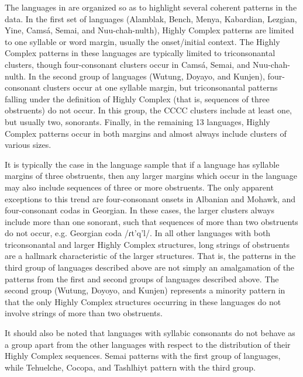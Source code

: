   The languages in  are organized so as to highlight several coherent patterns in the data. In the first set of languages (Alamblak, Bench, Menya, Kabardian, Lezgian, Yine, Camsá, Semai, and Nuu-chah-nulth), Highly Complex patterns are limited to one syllable or word margin, usually the onset/initial context. The Highly Complex patterns in these languages are typically limited to triconsonantal clusters, though four-consonant clusters occur in Camsá, Semai, and Nuu-chah-nulth. In the second group of languages (Wutung, Doyayo, and Kunjen), four-consonant clusters occur at one syllable margin, but triconsonantal patterns falling under the definition of Highly Complex (that is, sequences of three obstruents) do not occur. In this group, the CCCC clusters include at least one, but usually two, sonorants. Finally, in the remaining 13 languages, Highly Complex patterns occur in both margins and almost always include clusters of various sizes.

  It is typically the case in the language sample that if a language has syllable margins of three obstruents, then any larger margins which occur in the language may also include sequences of three or more obstruents. The only apparent exceptions to this trend are four-consonant onsets in Albanian and Mohawk, and four-consonant codas in Georgian. In these cases, the larger clusters always include more than one sonorant, such that sequences of more than two obstruents do not occur, e.g. Georgian coda /ɾt’q’l/. In all other languages with both triconsonantal and larger Highly Complex structures, long strings of obstruents are a hallmark characteristic of the larger structures. That is, the patterns in the third group of languages described above are not simply an amalgamation of the patterns from the first and second groups of languages described above. The second group (Wutung, Doyoyo, and Kunjen) represents a minority pattern in that the only Highly Complex structures occurring in these languages do not involve strings of more than two obstruents.

  It should also be noted that languages with syllabic consonants do not behave as a group apart from the other languages with respect to the distribution of their Highly Complex sequences. Semai patterns with the first group of languages, while Tehuelche, Cocopa, and Tashlhiyt pattern with the third group.

